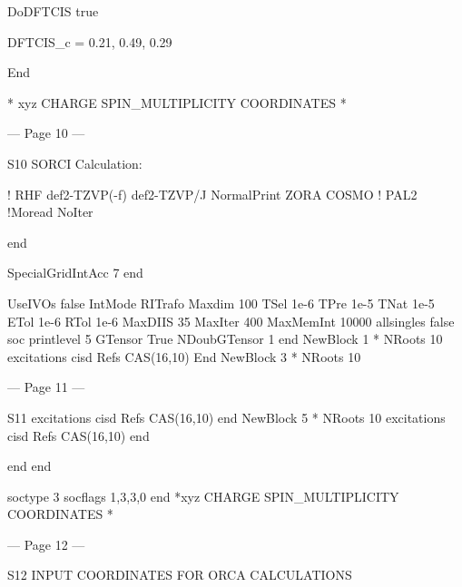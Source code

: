 DoDFTCIS true 
 
DFTCIS_c = 0.21, 0.49, 0.29 
 
End 
 
* xyz CHARGE SPIN_MULTIPLICITY 
COORDINATES 
* 
 
 
 
 
 
 
 
 
 


--- Page 10 ---
 
S10 
SORCI Calculation: 
 
! RHF def2-TZVP(-f) def2-TZVP/J NormalPrint ZORA COSMO 
! PAL2 
!Moread NoIter 
 
 
         end 
 
        SpecialGridIntAcc 7 
        end 
 
 
      UseIVOs         false 
      IntMode      RITrafo 
      Maxdim          100 
      TSel            1e-6 
      TPre            1e-5 
      TNat            1e-5 
      ETol            1e-6 
        RTol            1e-6 
        MaxDIIS           35 
        MaxIter           400 
        MaxMemInt       10000 
        allsingles false 
        soc 
        printlevel 5 
        GTensor True 
        NDoubGTensor 1 
        end 
        NewBlock 1 * 
                NRoots    10 
                excitations cisd 
                Refs 
                        CAS(16,10) 
                        End 
        NewBlock 3 * 
                NRoots    10 


--- Page 11 ---
 
S11 
                excitations cisd 
                Refs 
                        CAS(16,10) 
                        end 
        NewBlock 5 * 
                NRoots    10 
                excitations cisd 
                Refs 
                        CAS(16,10) 
                        end 
 
                end 
        end 
 
soctype 3 
socflags 1,3,3,0 
end 
*xyz CHARGE SPIN_MULTIPLICITY 
COORDINATES 
* 
 
 
 


--- Page 12 ---
 
S12 
INPUT COORDINATES FOR ORCA CALCULATIONS 
 
